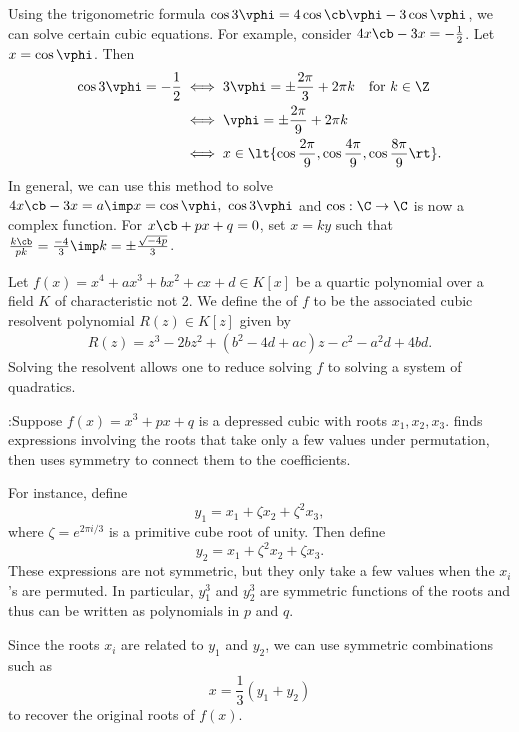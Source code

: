 \documentclass[a4paper]{article}
\begin{document}
\quad
Using the trigonometric formula \( \cos 3\vphi = 4\cos\cb \vphi-3\cos\vphi \), we can solve certain cubic equations.
For example, consider \( 4x\cb-3x=-\frac{1}{2} \).
Let \( x=\cos \vphi \).
Then \begin{align*}
  \cos 3\vphi = -\frac{1}{2} &\iff 3\vphi = \pm \frac{2\pi}{3}+2\pi k \quad \text{for } k\in \Z \\
  &\iff \vphi = \pm\frac{2\pi}{9}+2\pi k \\
  &\iff x \in \lt\{ \cos\frac{2\pi}{9},\cos\frac{4\pi}{9},\cos\frac{8\pi}{9} \rt\}.
\end{align*}
In general, we can use this method to solve \( 4x\cb-3x=a \imp x=\cos\vphi,\ \cos 3\vphi \) and \( \cos:\C\to\C \) is now a complex function.
For \( x\cb+px+q = 0 \), set \( x=ky \) such that \( \frac{k\cb}{pk} = \frac{-4}{3} \imp k = \pm\frac{\sqrt{-4p}}{3} \).

\begin{tdefinition}
  Let \( f(x) = x^4 + a x^3 + b x^2 + c x + d \in K[x] \) be a quartic polynomial over a field \( K \) of characteristic not 2.
  We define the  of \( f \) to be the associated cubic resolvent polynomial \( R(z) \in K[z] \) given by
  \begin{align*}
    R(z) = z^3 - 2b z^2 + (b^2 - 4d + a c) z - c^2 - a^2 d + 4b d.
  \end{align*}
  Solving the resolvent allows one to reduce solving \( f \) to solving a system of quadratics.
\end{tdefinition}

:\quad Suppose \( f(x) = x^3 + px + q \) is a depressed cubic with roots \( x_1, x_2, x_3 \).
     finds expressions involving the roots that take only a few values under permutation, then uses symmetry to connect them to the coefficients.

    For instance, define
    \[
      y_1 = x_1 + \zeta x_2 + \zeta^2 x_3,
    \]
    where \( \zeta = e^{2\pi i/3} \) is a primitive cube root of unity. Then define
    \[
      y_2 = x_1 + \zeta^2 x_2 + \zeta x_3.
    \]
    These expressions are not symmetric, but they only take a few values when the \( x_i \)'s are permuted. In particular, \( y_1^3 \) and \( y_2^3 \) are symmetric functions of the roots and thus can be written as polynomials in \( p \) and \( q \).

    Since the roots \( x_i \) are related to \( y_1 \) and \( y_2 \), we can use symmetric combinations such as
    \[
      x = \frac{1}{3}(y_1 + y_2)
    \]
    to recover the original roots of \( f(x) \).
\end{document}

